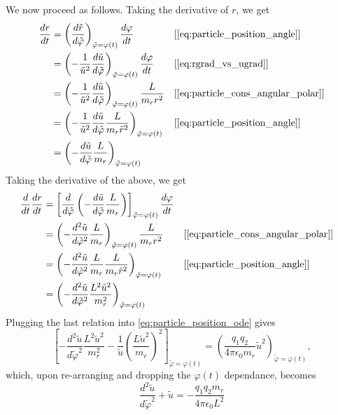 \documentclass[a4paper,11pt]{report}
\begin{document}
We now proceed as follows. Taking the derivative of $r$, we get
\begin{align}
    \label{eq:particle_derivation_1}
    \frac{dr}{dt} &= \left ( \frac{d \tilde{r}}{d\tilde{\varphi}} \right )_{\tilde{\varphi} = \varphi(t)} \frac{d \varphi}{dt} &&[\cref{eq:particle_position_angle}] \nonumber \\
    &= \left ( -\frac{1}{\tilde{u}^2} \frac{d\tilde{u}}{d\tilde{\varphi}} \right )_{\tilde{\varphi} = \varphi(t)} \frac{d \varphi}{dt} &&[\cref{eq:rgrad_vs_ugrad}]\nonumber \\ 
    &= \left ( -\frac{1}{\tilde{u}^2} \frac{d\tilde{u}}{d\tilde{\varphi}} \right )_{\tilde{\varphi} = \varphi(t)} \frac{L}{m_r r^2} &&[\cref{eq:particle_cons_angular_polar}] \nonumber \\
    &= \left ( -\frac{1}{\tilde{u}^2} \frac{d\tilde{u}}{d\tilde{\varphi}} \frac{L}{m_r \tilde{r}^2} \right )_{\tilde{\varphi} = \varphi(t)} &&[\cref{eq:particle_position_angle}] \nonumber \\
    &= \left ( - \frac{d\tilde{u}}{d\tilde{\varphi}} \frac{L}{m_r} \right )_{\tilde{\varphi} = \varphi(t)}
\end{align}
Taking the derivative of the above, we get
\begin{align}
    \frac{d}{dt} \frac{dr}{dt} &= \left [ \frac{d}{d\tilde{\varphi}} \left ( - \frac{d\tilde{u}}{d\tilde{\varphi}} \frac{L}{m_r} \right ) \right ]_{\tilde{\varphi} = \varphi(t)} \frac{d \varphi}{dt} \nonumber \\
    &= \left ( - \frac{d^2 \tilde{u}}{d\tilde{\varphi}^2} \frac{L}{m_r} \right )_{\tilde{\varphi} = \varphi(t)} \frac{L}{m_r r^2} && [\cref{eq:particle_cons_angular_polar}] \nonumber \\
    &= \left ( - \frac{d^2 \tilde{u}}{d\tilde{\varphi}^2} \frac{L}{m_r} \frac{L}{m_r \tilde{r}^2} \right )_{\tilde{\varphi} = \varphi(t)} && [\cref{eq:particle_position_angle}] \nonumber \\
    &= \left ( - \frac{d^2 \tilde{u}}{d\tilde{\varphi}^2} \frac{L^2 \tilde{u}^2}{m_r^2} \right )_{\tilde{\varphi} = \varphi(t)}
\end{align}
Plugging the last relation into \cref{eq:particle_position_ode} gives
\begin{equation}
    \left [ - \frac{d^2 \tilde{u}}{d\tilde{\varphi}^2} \frac{L^2 \tilde{u}^2}{m_r^2} - \frac{1}{\tilde{u}} \left ( \frac{L \tilde{u}^2}{m_r} \right )^2 \right ]_{\tilde{\varphi} = \varphi(t)} = \left ( \frac{q_1 q_2}{4 \pi \epsilon_0 m_r} \tilde{u}^2 \right )_{\tilde{\varphi} = \varphi(t)},
\end{equation}
which, upon re-arranging and dropping the $\varphi(t)$ dependance, becomes
\begin{equation}
    \frac{d^2 \tilde{u}}{d \tilde{\varphi}^2} + \tilde{u} = -\frac{q_1 q_2 m_r}{4 \pi \epsilon_0 L^2}
\end{equation}
\end{document}
